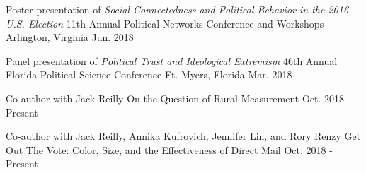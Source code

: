 

\begin{cventries}



\cventry
  {Poster presentation of \emph{Social Connectedness and Political Behavior in the 2016 U.S. Election}} %
  {11th Annual Political Networks Conference and Workshops} %
  {Arlington, Virginia} %
  {Jun. 2018} %
  {}


\cventry
  {Panel presentation of \emph{Political Trust and Ideological Extremism}} %
  {46th Annual Florida Political Science Conference} %
  {Ft. Myers, Florida} %
  {Mar. 2018} %
  {}

\cventry
  {Co-author with Jack Reilly} %
  {On the Question of Rural Measurement} %
  {Oct. 2018 - Present} %
  {} %
  {}


\cventry
  {Co-author with Jack Reilly, Annika Kufrovich, Jennifer Lin, and Rory Renzy} %
  {Get Out The Vote: Color, Size, and the Effectiveness of Direct Mail} %
  {Oct. 2018 - Present} %
  {} %
  {}

\end{cventries}
